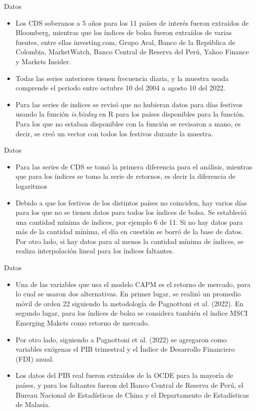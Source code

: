 \documentclass{beamer}
\begin{document}
\begin{frame}{Datos}
\begin{itemize}
    \item Los CDS soberanos a 5 años para los 11 países de interés fueron extraídos de Bloomberg, mientras que los índices de bolsa fueron extraídos de varias fuentes, entre ellas investing.com, Grupo Aval, Banco de la República de Colombia, MarketWatch, Banco Central de Reserva del Perú, Yahoo Finance y Markets Insider. 
    \item Todas las series anteriores tienen frecuencia diaria, y la muestra usada comprende el periodo entre octubre 10 del 2004 a agosto 10 del 2022.
    \item Para las series de indices se revisó que no hubieran datos para días festivos usando la función \textit{is.bizday} en R para los países disponibles para la función. Para los que no estaban disponibles con la función se revisaron a mano, es decir, se creó un vector con todos los festivos durante la muestra.
\end{itemize}    
\end{frame}

\begin{frame}{Datos}
\begin{itemize}
    \item Para las series de CDS se tomó la primera diferencia para el análisis, mientras que para los índices se tomo la serie de retornos, es decir la diferencia de logaritmos 
    \item Debido a que los festivos de los distintos países no coinciden, hay varios días para los que no se tienen datos para todos los índices de bolsa. Se estableció una cantidad mínima de índices, por ejemplo 6 de 11. Si no hay datos para más de la cantidad mínima, el día en cuestión se borró de la base de datos. Por otro lado, si hay datos para al menos la cantidad mínima de índices, se realiza interpolación lineal para los índices faltantes.
\end{itemize}    
\end{frame}

\begin{frame}{Datos}
\begin{itemize}
    \item Una de las variables que usa el modelo CAPM es el retorno de mercado, para lo cual se usaron dos alternativas. En primer lugar, se realizó un promedio móvil de orden 22 siguiendo la metodología de Pagnottoni et al. (2022). En segundo lugar, para los índices de bolsa se considera también el índice MSCI Emerging Makets como retorno de mercado.
    \item Por otro lado, siguiendo a Pagnottoni et al. (2022) se agregaron como variables exógenas el PIB trimestral y el Índice de Desarrollo Financiero (FDI) anual. 
    \item Los datos del PIB real fueron extraídos de la OCDE para la mayoría de países, y para los faltantes fueron del Banco Central de Reserva de Perú, el Bureau Nacional de Estadísticas de China y el Departamento de Estadísticas de Malasia. 
\end{itemize}    
\end{frame}
\end{document}
